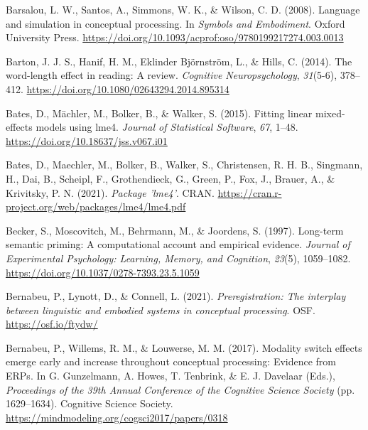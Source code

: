 \documentclass[
  12pt,
  man,floatsintext]{apa7}
\newlength{\cslhangindent}
\newlength{\cslentryspacingunit} %
\newenvironment{CSLReferences}[2] %
 {%
  \setlength{\parindent}{0pt}
  \ifodd #1
  \let\oldpar\par
  \def\par{\hangindent=\cslhangindent\oldpar}
  \fi
  \setlength{\parskip}{#2\cslentryspacingunit}
 }%
 {}
\begin{document}
\begin{CSLReferences}{1}{0}
\leavevmode{}%
Barsalou, L. W., Santos, A., Simmons, W. K., \& Wilson, C. D. (2008). Language and simulation in conceptual processing. In \emph{Symbols and {Embodiment}}. {Oxford University Press}. \url{https://doi.org/10.1093/acprof:oso/9780199217274.003.0013}

\leavevmode{}%
Barton, J. J. S., Hanif, H. M., Eklinder Björnström, L., \& Hills, C. (2014). The word-length effect in reading: {A} review. \emph{Cognitive Neuropsychology}, \emph{31}(5-6), 378--412. \url{https://doi.org/10.1080/02643294.2014.895314}

\leavevmode{}%
Bates, D., Mächler, M., Bolker, B., \& Walker, S. (2015). Fitting linear mixed-effects models using {lme4}. \emph{Journal of Statistical Software}, \emph{67}, 1--48. \url{https://doi.org/10.18637/jss.v067.i01}

\leavevmode{}%
Bates, D., Maechler, M., Bolker, B., Walker, S., Christensen, R. H. B., Singmann, H., Dai, B., Scheipl, F., Grothendieck, G., Green, P., Fox, J., Brauer, A., \& Krivitsky, P. N. (2021). \emph{Package '{lme4}'}. {CRAN}. \url{https://cran.r-project.org/web/packages/lme4/lme4.pdf}

\leavevmode{}%
Becker, S., Moscovitch, M., Behrmann, M., \& Joordens, S. (1997). Long-term semantic priming: {A} computational account and empirical evidence. \emph{Journal of Experimental Psychology: Learning, Memory, and Cognition}, \emph{23}(5), 1059--1082. \url{https://doi.org/10.1037/0278-7393.23.5.1059}

\leavevmode{}%
Bernabeu, P., Lynott, D., \& Connell, L. (2021). \emph{Preregistration: {The} interplay between linguistic and embodied systems in conceptual processing}. {OSF}. \url{https://osf.io/ftydw/}

\leavevmode{}%
Bernabeu, P., Willems, R. M., \& Louwerse, M. M. (2017). Modality switch effects emerge early and increase throughout conceptual processing: {Evidence} from {ERPs}. In G. Gunzelmann, A. Howes, T. Tenbrink, \& E. J. Davelaar (Eds.), \emph{Proceedings of the 39th {Annual Conference} of the {Cognitive Science Society}} (pp. 1629--1634). {Cognitive Science Society}. \url{https://mindmodeling.org/cogsci2017/papers/0318}


\end{CSLReferences}
\end{document}
